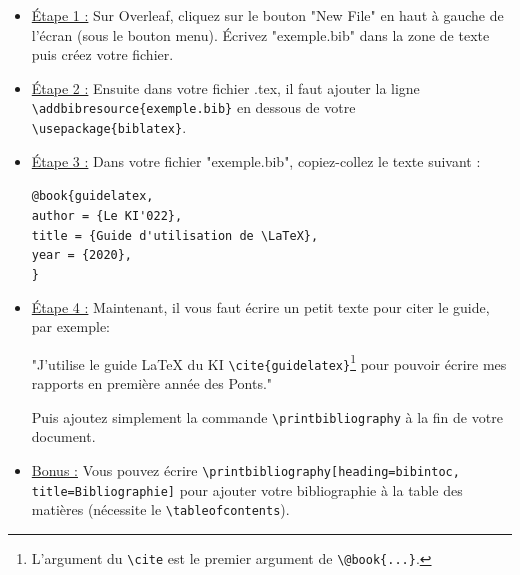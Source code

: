 \documentclass[11pt]{article}				%
\newcommand{\tb}{\textbackslash}
\newcommand{\cmd}[2]{\texttt{\textbackslash #1}\texttt{\{#2\}}}
\begin{document}
\begin{itemize}
	\item \underline{Étape 1 :} Sur Overleaf, cliquez sur le bouton "New File" en haut à gauche de l'écran (sous le bouton menu). Écrivez "exemple.bib" dans la zone de texte puis créez votre fichier.\\
	
	\item \underline{Étape 2 :} Ensuite dans votre fichier .tex, il faut ajouter la ligne \cmd{addbibresource}{exemple.bib} en dessous de votre \cmd{usepackage}{biblatex}.\\
	
	\item \underline{Étape 3 :} Dans votre fichier "exemple.bib", copiez-collez le texte suivant :
	\begin{flushleft}
		\verb|@book{guidelatex,| \\
		\qquad	\verb|author = {Le KI'022},| \\
		\qquad	\verb|title = {Guide d'utilisation de \LaTeX},| \\
		\qquad   \verb|year = {2020},| \\
		\verb|}| \\
		
	\end{flushleft}
	
	\item \underline{Étape 4 :} Maintenant, il vous faut écrire un petit texte pour citer le guide, par exemple:
	
	"J'utilise le guide LaTeX du KI \cmd{cite}{guidelatex}\footnote{L'argument du \texttt{\tb cite} est le premier argument de \texttt{\tb @book\{...\}}.} pour pouvoir écrire mes rapports en première année des Ponts."
	
	Puis ajoutez simplement la commande \verb|\printbibliography| à la fin de votre document.\\
	
	\item \underline{Bonus :} Vous pouvez écrire \verb|\printbibliography[heading=bibintoc, title=Bibliographie]| pour ajouter votre bibliographie à la table des matières (nécessite le \verb|\tableofcontents|).
	
\end{itemize}
\end{document}
